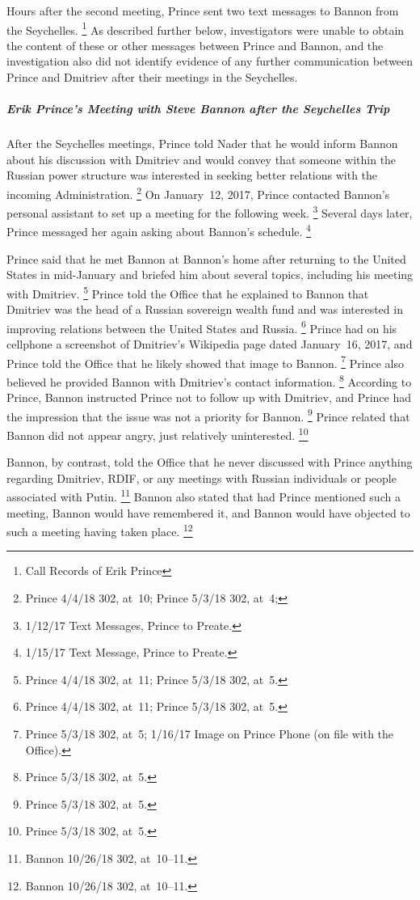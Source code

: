 Hours after the second meeting, Prince sent two text messages to Bannon from the Seychelles.%
\footnote{Call Records of Erik Prince }
As described further below, investigators were unable to obtain the content of these or other messages between Prince and Bannon, and the investigation also did not identify evidence of any further communication between Prince and Dmitriev after their meetings in the Seychelles.

\subparagraph{Erik Prince's Meeting with Steve Bannon after the Seychelles Trip}

After the Seychelles meetings, Prince told Nader that he would inform Bannon about his discussion with Dmitriev and would convey that someone within the Russian power structure was interested in seeking better relations with the incoming Administration.%
\footnote{Prince 4/4/18 302, at~10;
Prince 5/3/18 302, at~4;
}
On January~12, 2017, Prince contacted Bannon's personal assistant to set up a meeting for the following week.%
\footnote{1/12/17 Text Messages, Prince to Preate.}
Several days later, Prince messaged her again asking about Bannon's schedule.%
\footnote{1/15/17 Text Message, Prince to Preate.}

Prince said that he met Bannon at Bannon's home after returning to the United States in mid-January and briefed him about several topics, including his meeting with Dmitriev.%
\footnote{Prince 4/4/18 302, at~11;
Prince 5/3/18 302, at~5.}
Prince told the Office that he explained to Bannon that Dmitriev was the head of a Russian sovereign wealth fund and was interested in improving relations between the United States and Russia.%
\footnote{Prince 4/4/18 302, at~11;
Prince 5/3/18 302, at~5.}
Prince had on his cellphone a screenshot of Dmitriev's Wikipedia page dated January~16, 2017, and Prince told the Office that he likely showed that image to Bannon.%
\footnote{Prince 5/3/18 302, at~5;
1/16/17 Image on Prince Phone (on file with the Office).}
Prince also believed he provided Bannon with Dmitriev's contact information.%
\footnote{Prince 5/3/18 302, at~5.}
According to Prince, Bannon instructed Prince not to follow up with Dmitriev, and Prince had the impression that the issue was not a priority for Bannon.%
\footnote{Prince 5/3/18 302, at~5.}
Prince related that Bannon did not appear angry, just relatively uninterested.%
\footnote{Prince 5/3/18 302, at~5.}

Bannon, by contrast, told the Office that he never discussed with Prince anything regarding Dmitriev, RDIF, or any meetings with Russian individuals or people associated with Putin.%
\footnote{Bannon 10/26/18 302, at~10--11.}
Bannon also stated that had Prince mentioned such a meeting, Bannon would have remembered it, and Bannon would have objected to such a meeting having taken place.%
\footnote{Bannon 10/26/18 302, at~10--11.}

